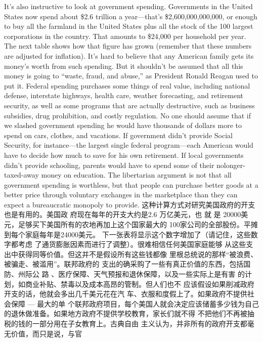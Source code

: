 \begin{paracol}{2}
\switchcolumn*
It's also instructive to look at government spending. Governments in the United States now spend about \$2.6 trillion a
year---that's \$2,600,000,000,000, or enough to buy all the
farmland in the United States plus all the stock of the 100
largest corporations in the country. That amounts to \$24,000
per household per year. The next table shows how that figure
has grown (remember that these numbers are adjusted for inflation). It's hard to believe that any American family gets its
money's worth from such spending. But it shouldn't be assumed that all this money is going to ``waste, fraud, and abuse,''
as President Ronald Reagan used to put it. Federal spending
purchases some things of real value, including national defense,
interstate highways, health care, weather forecasting, and retirement security, as well as some programs that are actually destructive, such as business subsidies, drug prohibition, and
costly regulation. No one should assume that if we slashed government spending he would have thousands of dollars more to
spend on cars, clothes, and vacations. If government didn't provide Social Security, for instance---the largest single federal program---each American would have to decide how much to save
for his own retirement. If local governments didn't provide
schooling, parents would have to spend some of their nolonger-taxed-away money on education. The libertarian argument is not that all government spending is worthless, but that
people can purchase better goods at a better price through voluntary exchanges in the marketplace than they can expect a bureaucratic monopoly to provide.
\switchcolumn
这种计算方式对研究美国政府的开支也是有用的。美国政
府现在每年的开支大约是2.6 万亿美元，也 就 是 2\thinspace0000美元，足够买下美国所有的农地再加上这个国家最大的
100家公司的全部股份。平摊到每个家庭每年是24000美元。
下一张表将显示这个数字增加了（请记住，这些数字都考虑
了通货膨胀因素而进行了调整）。很难相信任何美国家庭能够
从这些支出中获得同等价值。但这并不是假设所有这些钱都像
里根总统说的那样“被浪费、被骗走、被滥用”。联邦政府的
支出的确采购了一些有真正价值的东西，包括国防、州际公
路 、医疗保障、天气预报和退休保障，以及一些实际上是有害
的计划，如商业补贴、禁毒以及成本高昂的管制。但人们也不
应该假设如果削减政府开支的话，他就会多出几千美元花在汽
车、衣服和度假上了。如果政府不提供社会保障 --- 最大的单
个联邦政府项目，每个美国人就会决定应该储蓄多少钱为自己
的退休做准备。如果地方政府不提供学校教育，家长们就不得
不把他们不再被抽税的钱的一部分用在子女教育上。古典自由
主义认为，并非所有的政府开支都毫无价值，而只是说，与官

\end{paracol}
